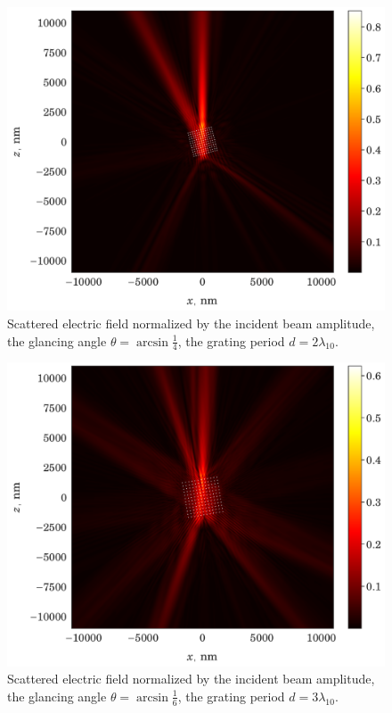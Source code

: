 \documentclass[conference]{IEEEtran}
\begin{document}
\begin{figure}[htbp]
	\centerline{\includegraphics[width=0.9\columnwidth]{../components/img/celes/TE_14.324deg_check.pdf}}
	\caption{Scattered electric field normalized by the incident beam amplitude, the glancing angle $\theta = \arcsin\frac{1}{4}$, the grating period $d = 2\lambda_{10}$.}
	\label{14.324deg:image}
\end{figure}

\begin{figure}[htbp]
	\centerline{\includegraphics[width=0.9\columnwidth]{../components/img/celes/TE_9.594deg_check_3lambda.pdf}}
	\caption{Scattered electric field normalized by the incident beam amplitude, the glancing angle $\theta = \arcsin\frac{1}{6}$, the grating period $d = 3\lambda_{10}$.}
	\label{9.594deg:image}
\end{figure}
\end{document}
